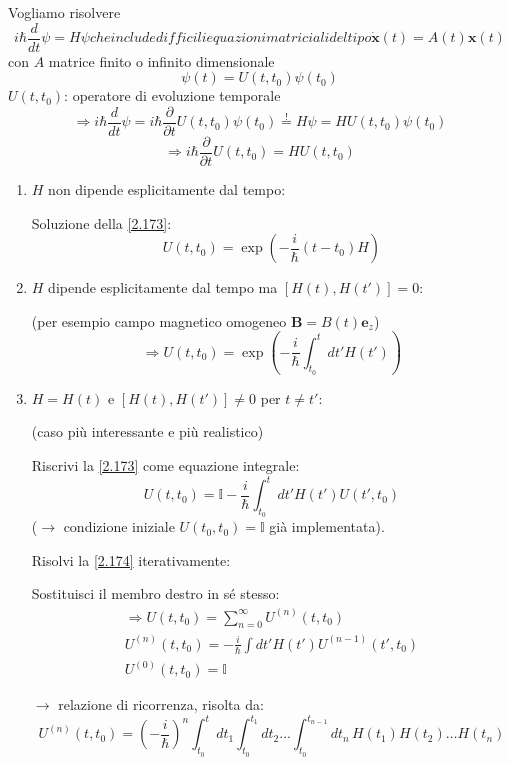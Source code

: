\documentclass[a4paper,11pt]{report}
\newcommand{\vect}[1]{\boldsymbol{#1}}
\newcommand{\x}{\boldsymbol{x}}
\begin{document}
Vogliamo risolvere
\begin{subequations}
\begin{equation}
i\hbar \frac{d}{dt}\psi = H \psi 
\label{2.171a}
\end{equation}
che include difficili equazioni matriciali del tipo 
\begin{equation}
\dot{\x}(t)=A(t)\x(t)
\label{2.171b}
\end{equation}
\end{subequations}
con $A$ matrice finito o infinito dimensionale
\begin{equation}
\psi(t)=U(t,t_0)\psi(t_0)
\label{2.172}
\end{equation}
$U(t,t_0)$: operatore di evoluzione temporale
\[
\Rightarrow i\hbar \frac{d}{dt}\psi = i\hbar \frac{\partial}{\partial t}U(t,t_0)\psi(t_0)\overset{!}{=}H\psi = HU(t,t_0)\psi(t_0)
\]
\begin{equation}
\Rightarrow i\hbar \frac{\partial }{\partial t}U(t,t_0)=HU(t,t_0) 
\label{2.173}
\end{equation}
\begin{enumerate}[label=(\roman*)]
\item $H$ non dipende esplicitamente dal tempo:

Soluzione della \eqref{2.173}:
\[
U(t,t_0)=\exp \left(-\frac{i}{\hbar}(t-t_0)H\right)
\]
\item $H$ dipende esplicitamente dal tempo ma $[H(t),H(t')]=0$:

(per esempio campo magnetico omogeneo $\vect{B}=B(t)\vect{e}_z$)
\[
\Rightarrow U(t,t_0)=\exp \left(-\frac{i}{\hbar}\int_{t_0}^t dt' H(t')\right)
\]
\item $H=H(t)$ e $[H(t),H(t')]\neq 0$ per $t\neq t'$:

(caso pi\`u interessante e pi\`u realistico)

Riscrivi la \eqref{2.173} come equazione integrale:
\begin{equation}
U(t,t_0) = \mathbb{I} - \frac{i}{\hbar}\int_{t_0}^t dt' H(t')U(t',t_0)
\label{2.174}
\end{equation}
($\rightarrow$ condizione iniziale $U(t_0,t_0)=\mathbb{I}$ gi\`a implementata).

Risolvi la \eqref{2.174} iterativamente: 

Sostituisci il membro destro in s\'e stesso:
\begin{equation}
\begin{gathered}
\Rightarrow U(t,t_0)=\sum_{n=0}^\infty U^{(n)}(t,t_0)\\
U^{(n)}(t,t_0)=-\frac{i}{\hbar}\int dt' H(t') U^{(n-1)}(t',t_0)\\
U^{(0)}(t,t_0)=\mathbb{I}
\end{gathered} 
\label{2.175}
\end{equation}

$\rightarrow$ relazione di ricorrenza, risolta da:
\begin{equation}
U^{(n)}(t,t_0)=\left(-\frac{i}{\hbar}\right)^n\int_{t_0}^tdt_1 \int_{t_0}^{t_1}dt_2 \ldots \int_{t_0}^{t_{n-1}}dt_n\, H(t_1)H(t_2) \ldots H(t_n)
\label{2.176}
\end{equation}
\end{enumerate}
\end{document}
